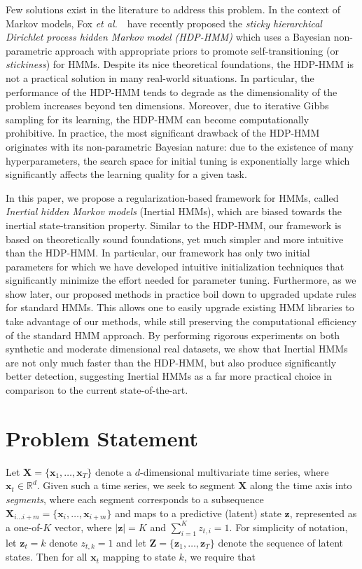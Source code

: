 \documentclass[letterpaper]{article}
\begin{document}
Few solutions exist in the literature to address this problem. In
the context of Markov models, Fox \emph{et al.}~\cite{fox2011sticky}\ have
recently proposed the \emph{sticky hierarchical Dirichlet process hidden Markov
model (HDP-HMM)} which uses a Bayesian non-parametric approach with appropriate
priors to promote self-transitioning (or \emph{stickiness}) for HMMs. Despite its
nice theoretical foundations, the HDP-HMM is not a practical solution in many real-world situations.
In particular, the performance of the HDP-HMM tends to degrade as the
dimensionality of the problem increases beyond ten dimensions. Moreover, due to 
iterative Gibbs sampling for its learning, the HDP-HMM can become computationally prohibitive. 
In practice, the most significant drawback of the HDP-HMM originates with its non-parametric 
Bayesian nature: due to the existence of many hyperparameters, the search space for initial tuning is 
exponentially large which significantly affects the learning quality for a given task.

In this paper, we propose a regularization-based framework for HMMs, called
\emph{Inertial hidden Markov models} (Inertial HMMs), which are biased towards the inertial 
state-transition property. Similar to the HDP-HMM, our framework is based on 
theoretically sound foundations, yet much simpler and more intuitive than the HDP-HMM. 
In particular, our framework has only two initial parameters for which we have 
developed intuitive initialization techniques that significantly minimize the effort 
needed for parameter tuning. Furthermore, as we show later, our proposed
methods in practice boil down to upgraded update rules for standard HMMs. This allows one to easily 
upgrade existing HMM libraries to take advantage of our methods, while still preserving the
computational efficiency of the standard HMM approach. By performing rigorous
experiments on both synthetic and moderate dimensional real datasets, we show
that Inertial HMMs are not only much faster than the HDP-HMM, but also produce 
significantly better detection, suggesting Inertial HMMs as a far more practical 
choice in comparison to the current state-of-the-art.
\vspace{-0.2cm}
\section{Problem Statement}
\vspace{-0.1cm}
Let $\mathbf{X} = \{\mathbf{x}_1, \ldots, \mathbf{x}_T\}$ denote a
$d$-dimensional multivariate time series, where $\mathbf{x}_t \in \mathbb{R}^d$.
Given such a time series, we seek to segment $\mathbf{X}$ along the time axis
into \emph{segments}, where each segment corresponds to a subsequence
$\mathbf{X}_{i\ldots i+m} = \{\mathbf{x}_i, \ldots, \mathbf{x}_{i+m}\}$ and maps
to a predictive (latent) state $\mathbf{z}$, represented as a one-of-$K$ vector,
where $|\mathbf{z}| = K$ and $\sum_{i=1}^{K}z_{t,i} = 1$. For simplicity of
notation, let $\mathbf{z}_{t} = k$ denote $z_{t,k} = 1$ and let $\mathbf{Z} =
\{\mathbf{z}_1, \ldots, \mathbf{z}_T\}$ denote the sequence of latent states.
Then for all $\mathbf{x}_{t}$ mapping to state $k$, we require that
\end{document}
